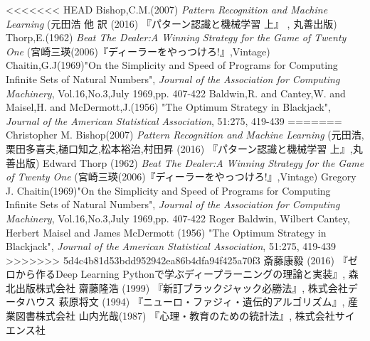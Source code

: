 \begin{thebibliography}{9}
<<<<<<< HEAD
   Bishop,C.M.(2007) {\it{Pattern Recognition and Machine Learning}} (元田浩 他 訳 (2016) 『パターン認識と機械学習 上』 , 丸善出版)
   Thorp,E.(1962) {\it{Beat The Dealer:A Winning Strategy for the Game of Twenty One}} (宮崎三瑛(2006)『ディーラーをやっつけろ!』,Vintage)
   Chaitin,G.J(1969)"On the Simplicity and Speed of Programs for Computing Infinite Sets of Natural Numbers", {\it{Journal of the Association for Computing Machinery}}, Vol.16,No.3,July 1969,pp. 407-422
   Baldwin,R. and Cantey,W. and Maisel,H. and McDermott,J.(1956) "The Optimum Strategy in Blackjack", {\it{Journal of the American Statistical Association}}, 51:275, 419-439
=======
   Christopher M. Bishop(2007) {\it{Pattern Recognition and Machine Learning}} (元田浩,栗田多喜夫,樋口知之,松本裕治,村田昇 (2016) 『パターン認識と機械学習 上』,丸善出版)
   Edward Thorp (1962) {\it{Beat The Dealer:A Winning Strategy for the Game of Twenty One}} (宮崎三瑛(2006)『ディーラーをやっつけろ!』,Vintage)
   Gregory J. Chaitin(1969)"On the Simplicity and Speed of Programs for Computing Infinite Sets of Natural Numbers", {\it{Journal of the Association for Computing Machinery}}, Vol.16,No.3,July 1969,pp. 407-422
   Roger Baldwin, Wilbert Cantey, Herbert Maisel and James McDermott (1956) "The Optimum Strategy in Blackjack", {\it{Journal of the American Statistical Association}}, 51:275, 419-439
>>>>>>> 5d4c4b81d53bdd952942ea86b4dfa94f425a70f3
   斎藤康毅 (2016) 『ゼロから作るDeep Learning Pythonで学ぶディープラーニングの理論と実装』, 森北出版株式会社
   齋藤隆浩 (1999) 『新訂ブラックジャック必勝法』, 株式会社データハウス
   萩原将文 (1994) 『ニューロ・ファジィ・遺伝的アルゴリズム』, 産業図書株式会社
   山内光哉(1987) 『心理・教育のための統計法』, 株式会社サイエンス社
\end{thebibliography}
